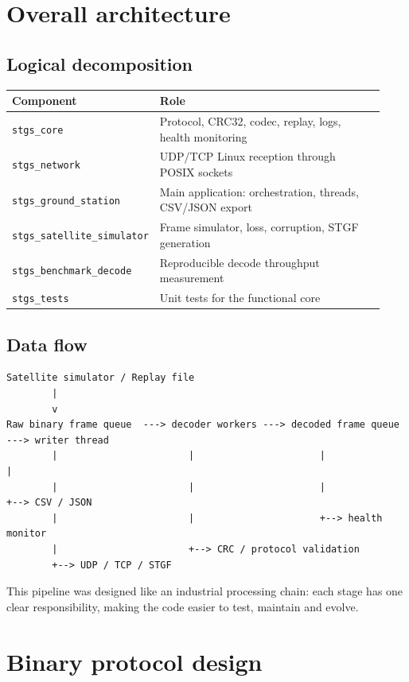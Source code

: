 \documentclass[10pt,a4paper]{article}
\begin{document}
\section{Overall architecture}

\subsection{Logical decomposition}
\begin{longtable}{@{}p{0.25\linewidth}p{0.68\linewidth}@{}}
\toprule
Component & Role \\
\midrule
\texttt{stgs\_core} & Protocol, CRC32, codec, replay, logs, health monitoring \\
\texttt{stgs\_network} & UDP/TCP Linux reception through POSIX sockets \\
\texttt{stgs\_ground\_station} & Main application: orchestration, threads, CSV/JSON export \\
\texttt{stgs\_satellite\_simulator} & Frame simulator, loss, corruption, STGF generation \\
\texttt{stgs\_benchmark\_decode} & Reproducible decode throughput measurement \\
\texttt{stgs\_tests} & Unit tests for the functional core \\
\bottomrule
\end{longtable}

\subsection{Data flow}
\begin{verbatim}
Satellite simulator / Replay file
        |
        v
Raw binary frame queue  ---> decoder workers ---> decoded frame queue ---> writer thread
        |                       |                      |                     |
        |                       |                      |                     +--> CSV / JSON
        |                       |                      +--> health monitor
        |                       +--> CRC / protocol validation
        +--> UDP / TCP / STGF
\end{verbatim}

This pipeline was designed like an industrial processing chain: each stage has one clear responsibility, making the code easier to test, maintain and evolve.

\section{Binary protocol design}
\end{document}
